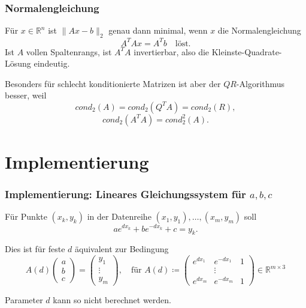 \documentclass[a4paper, 11pt]{beamer}
\begin{document}
\begin{frame}
    \frametitle{Normalengleichung}

    Für $x \in \mathbb{R}^n$ ist $\|Ax-b\|_2$ genau dann minimal, wenn $x$ die Normalengleichung
    $$A^T A x = A^T b \quad \text{löst.}$$
    Ist $A$ vollen Spaltenrangs, ist $A^T A$ invertierbar, also die Kleinste-Quadrate-Lösung eindeutig.

    \vspace{0.25cm}

    Besonders für schlecht konditionierte Matrizen ist aber der $QR$-Algorithmus besser, weil
    $$ cond_2(A) = cond_2(Q^T A) = cond_2(R), $$
    $$ cond_2(A^T A) = cond_2^2(A).$$

\end{frame}




\section{Implementierung}
\newcommand{\x}{\left( \begin{array}{c} x_1\\ \vdots \\x_m \end{array} \right)}
\newcommand{\y}{\left( \begin{array}{c} y_1\\ \vdots \\y_m \end{array} \right)}
\newcommand{\A}{\left( \begin{array}{ccc} e^{dx_1} & e^{-dx_1} & 1 \\
    &\vdots \\
    e^{dx_m} & e^{-dx_m} & 1 \end{array} \right)}
\newcommand{\abc}{\left( \begin{array}{c} a \\ b \\ c \end{array} \right)}

\begin{frame}
    \frametitle{Implementierung: Lineares Gleichungssystem für $a,b,c$}

    Für Punkte $(x_k,y_k)$ in der Datenreihe $(x_1, y_1), \hdots, (x_m, y_m)$ soll
    $$ ae^{dx_k} + be^{-dx_k} +c = y_k. $$
    
    Dies ist für feste $d$ äquivalent zur Bedingung
    $$ A(d) \abc = \y, \quad \text{für } A(d) \coloneqq \A \in \mathbb{R}^{m \times 3}$$

    \vspace{\baselineskip}
    Parameter $d$ kann so nicht berechnet werden.

\end{frame}
\end{document}
